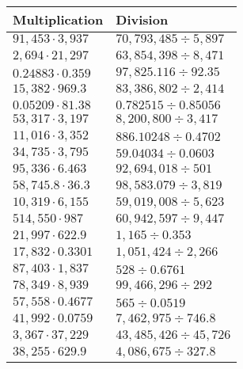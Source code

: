 \begin{longtable}[]{@{}ll@{}}
\toprule
Multiplication & Division\tabularnewline
\midrule
\endhead
\(91,453\cdot3,937\) & \(70,793,485÷5,897\)\tabularnewline
\(2,694\cdot 21,297\) & \(63,854,398÷8,471\)\tabularnewline
\(0.24883\cdot0.359\) & \(97,825.116÷92.35\)\tabularnewline
\(15,382\cdot969.3\) & \(83,386,802÷2,414\)\tabularnewline
\(0.05209\cdot81.38\) & \(0.782515÷0.85056\)\tabularnewline
\(53,317\cdot3,197\) & \(8,200,800÷3,417\)\tabularnewline
\(11,016\cdot3,352\) & \(886.10248÷0.4702\)\tabularnewline
\(34,735\cdot3,795\) & \(59.04034÷0.0603\)\tabularnewline
\(95,336\cdot6.463\) & \(92,694,018÷501\)\tabularnewline
\(58,745.8\cdot36.3\) & \(98,583.079÷3,819\)\tabularnewline
\(10,319\cdot6,155\) & \(59,019,008÷5,623\)\tabularnewline
\(514,550\cdot987\) & \(60,942,597÷9,447\)\tabularnewline
\(21,997\cdot622.9\) & \(1,165÷0.353\)\tabularnewline
\(17,832\cdot0.3301\) & \(1,051,424÷2,266\)\tabularnewline
\(87,403\cdot1,837\) & \(528÷0.6761\)\tabularnewline
\(78,349\cdot8,939\) & \(99,466,296÷292\)\tabularnewline
\(57,558\cdot0.4677\) & \(565÷0.0519\)\tabularnewline
\(41,992\cdot0.0759\) & \(7,462,975÷746.8\)\tabularnewline
\(3,367\cdot37,229\) & \(43,485,426÷45,726\)\tabularnewline
\(38,255\cdot629.9\) & \(4,086,675÷327.8\)\tabularnewline
\bottomrule
\end{longtable}
